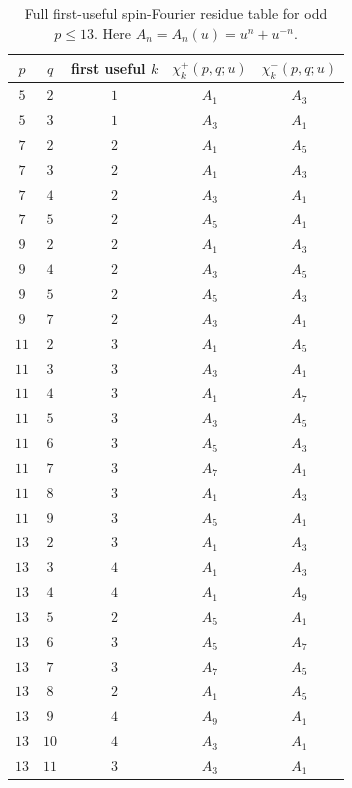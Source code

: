\documentclass{article}
\theoremstyle{definition}
\numberwithin{equation}{section}
\begin{document}
\begin{table}[!htbp]
\centering
\small
\setlength{\tabcolsep}{4pt}
\renewcommand{\arraystretch}{1.12}
\begin{tabular}{c|c|c|c|c}
$p$ & $q$ & first useful $k$ & $\chi_k^+(p,q;u)$ & $\chi_k^-(p,q;u)$ \\
\hline
$5$ & $2$ & $1$ & $A_1$ & $A_3$ \\
$5$ & $3$ & $1$ & $A_3$ & $A_1$ \\
\hline
$7$ & $2$ & $2$ & $A_1$ & $A_5$ \\
$7$ & $3$ & $2$ & $A_1$ & $A_3$ \\
$7$ & $4$ & $2$ & $A_3$ & $A_1$ \\
$7$ & $5$ & $2$ & $A_5$ & $A_1$ \\
\hline
$9$ & $2$ & $2$ & $A_1$ & $A_3$ \\
$9$ & $4$ & $2$ & $A_3$ & $A_5$ \\
$9$ & $5$ & $2$ & $A_5$ & $A_3$ \\
$9$ & $7$ & $2$ & $A_3$ & $A_1$ \\
\hline
$11$ & $2$ & $3$ & $A_1$ & $A_5$ \\
$11$ & $3$ & $3$ & $A_3$ & $A_1$ \\
$11$ & $4$ & $3$ & $A_1$ & $A_7$ \\
$11$ & $5$ & $3$ & $A_3$ & $A_5$ \\
$11$ & $6$ & $3$ & $A_5$ & $A_3$ \\
$11$ & $7$ & $3$ & $A_7$ & $A_1$ \\
$11$ & $8$ & $3$ & $A_1$ & $A_3$ \\
$11$ & $9$ & $3$ & $A_5$ & $A_1$ \\
\hline
$13$ & $2$ & $3$ & $A_1$ & $A_3$ \\
$13$ & $3$ & $4$ & $A_1$ & $A_3$ \\
$13$ & $4$ & $4$ & $A_1$ & $A_9$ \\
$13$ & $5$ & $2$ & $A_5$ & $A_1$ \\
$13$ & $6$ & $3$ & $A_5$ & $A_7$ \\
$13$ & $7$ & $3$ & $A_7$ & $A_5$ \\
$13$ & $8$ & $2$ & $A_1$ & $A_5$ \\
$13$ & $9$ & $4$ & $A_9$ & $A_1$ \\
$13$ & $10$ & $4$ & $A_3$ & $A_1$ \\
$13$ & $11$ & $3$ & $A_3$ & $A_1$
\end{tabular}
\caption{Full first-useful spin-Fourier residue table for odd $p\leq13$.  Here $A_n=A_n(u)=u^n+u^{-n}$.}
\label{tab:first-useful-spin-fourier}
\end{table}
\end{document}

